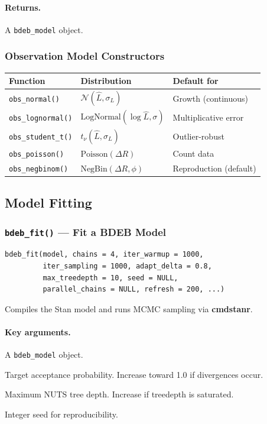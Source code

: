 \documentclass[11pt,a4paper]{article}
\newcommand{\pkg}[1]{\textbf{#1}}
\newcommand{\fn}[1]{\texttt{#1()}}
\newcommand{\code}[1]{\texttt{#1}}
\begin{document}
\paragraph{Returns.} A \code{bdeb\_model} object.

\subsubsection{Observation Model Constructors}

\begin{longtable}{lll}
\toprule
\textbf{Function} & \textbf{Distribution} & \textbf{Default for} \\
\midrule
\fn{obs\_normal}    & $\mathcal{N}(\hat{L}, \sigma_L)$ & Growth (continuous) \\
\fn{obs\_lognormal} & $\text{LogNormal}(\log\hat{L}, \sigma)$ & Multiplicative error \\
\fn{obs\_student\_t} & $t_\nu(\hat{L}, \sigma_L)$ & Outlier-robust \\
\fn{obs\_poisson}   & $\text{Poisson}(\Delta R)$ & Count data \\
\fn{obs\_negbinom}  & $\text{NegBin}(\Delta R, \phi)$ & Reproduction (default) \\
\bottomrule
\end{longtable}

\subsection{Model Fitting}

\subsubsection{\fn{bdeb\_fit} --- Fit a BDEB Model}

\begin{lstlisting}
bdeb_fit(model, chains = 4, iter_warmup = 1000,
         iter_sampling = 1000, adapt_delta = 0.8,
         max_treedepth = 10, seed = NULL,
         parallel_chains = NULL, refresh = 200, ...)
\end{lstlisting}

Compiles the Stan model and runs MCMC sampling via \pkg{cmdstanr}.

\paragraph{Key arguments.}
\begin{description}[nosep,leftmargin=3.5cm]
  \item[\code{model}] A \code{bdeb\_model} object.
  \item[\code{adapt\_delta}] Target acceptance probability.  Increase toward 1.0 if divergences occur.
  \item[\code{max\_treedepth}] Maximum NUTS tree depth.  Increase if treedepth is saturated.
  \item[\code{seed}] Integer seed for reproducibility.
\end{description}
\end{document}
